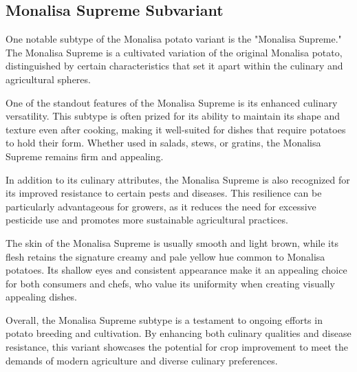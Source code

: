 \documentclass[../../../../main.tex]{subfiles}
\begin{document}
\subsection{Monalisa Supreme Subvariant}
One notable subtype of the Monalisa potato variant is the "Monalisa Supreme." The Monalisa Supreme is a cultivated variation of the original Monalisa potato, distinguished by certain characteristics that set it apart within the culinary and agricultural spheres.

One of the standout features of the Monalisa Supreme is its enhanced culinary versatility. This subtype is often prized for its ability to maintain its shape and texture even after cooking, making it well-suited for dishes that require potatoes to hold their form. Whether used in salads, stews, or gratins, the Monalisa Supreme remains firm and appealing.

In addition to its culinary attributes, the Monalisa Supreme is also recognized for its improved resistance to certain pests and diseases. This resilience can be particularly advantageous for growers, as it reduces the need for excessive pesticide use and promotes more sustainable agricultural practices.

The skin of the Monalisa Supreme is usually smooth and light brown, while its flesh retains the signature creamy and pale yellow hue common to Monalisa potatoes. Its shallow eyes and consistent appearance make it an appealing choice for both consumers and chefs, who value its uniformity when creating visually appealing dishes.

Overall, the Monalisa Supreme subtype is a testament to ongoing efforts in potato breeding and cultivation. By enhancing both culinary qualities and disease resistance, this variant showcases the potential for crop improvement to meet the demands of modern agriculture and diverse culinary preferences.
\end{document}
